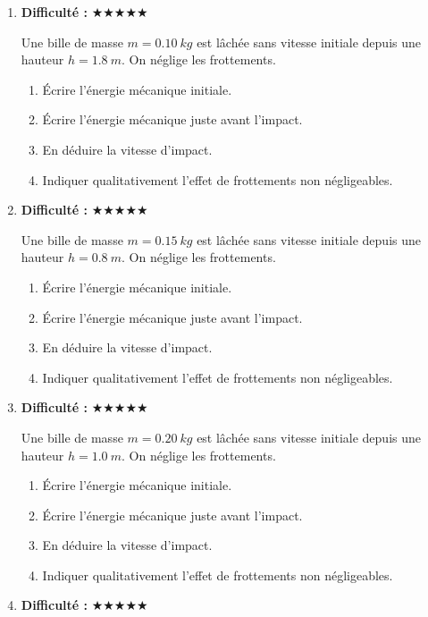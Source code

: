 \documentclass[11pt,a4paper]{article}
\newcommand{\etoiles}[1]{\textbf{Difficulté : }#1}
\begin{document}
\begin{enumerate}[label=\textbf{Exercice \arabic*.},leftmargin=*]
Une bille de masse $m=0.30\ \si{kg}$ est lâchée sans vitesse initiale depuis une hauteur $h=1.6\ \si{m}$.
On néglige les frottements.
\begin{enumerate}[label=\alph*)]
\item Écrire l'énergie mécanique initiale.
\item Écrire l'énergie mécanique juste avant l'impact.
\item En déduire la vitesse d'impact.
\item Indiquer qualitativement l'effet de frottements non négligeables.
\end{enumerate}
\item \etoiles{★★★★★}

Une bille de masse $m=0.10\ \si{kg}$ est lâchée sans vitesse initiale depuis une hauteur $h=1.8\ \si{m}$.
On néglige les frottements.
\begin{enumerate}[label=\alph*)]
\item Écrire l'énergie mécanique initiale.
\item Écrire l'énergie mécanique juste avant l'impact.
\item En déduire la vitesse d'impact.
\item Indiquer qualitativement l'effet de frottements non négligeables.
\end{enumerate}
\item \etoiles{★★★★★}

Une bille de masse $m=0.15\ \si{kg}$ est lâchée sans vitesse initiale depuis une hauteur $h=0.8\ \si{m}$.
On néglige les frottements.
\begin{enumerate}[label=\alph*)]
\item Écrire l'énergie mécanique initiale.
\item Écrire l'énergie mécanique juste avant l'impact.
\item En déduire la vitesse d'impact.
\item Indiquer qualitativement l'effet de frottements non négligeables.
\end{enumerate}
\item \etoiles{★★★★★}

Une bille de masse $m=0.20\ \si{kg}$ est lâchée sans vitesse initiale depuis une hauteur $h=1.0\ \si{m}$.
On néglige les frottements.
\begin{enumerate}[label=\alph*)]
\item Écrire l'énergie mécanique initiale.
\item Écrire l'énergie mécanique juste avant l'impact.
\item En déduire la vitesse d'impact.
\item Indiquer qualitativement l'effet de frottements non négligeables.
\end{enumerate}
\item \etoiles{★★★★★}


\end{enumerate}
\end{document}
